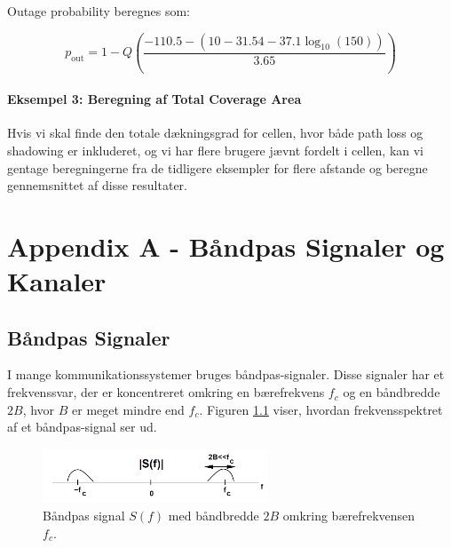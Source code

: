\documentclass[a4paper,12pt]{book}
\begin{document}
	Outage probability beregnes som:
	
	\[
	p_{\text{out}} = 1 - Q\left(\frac{-110.5 - \left(10 - 31.54 - 37.1 \log_{10}(150)\right)}{3.65}\right)
	\]
	
	\subsubsection{Eksempel 3: Beregning af Total Coverage Area}
	
	Hvis vi skal finde den totale dækningsgrad for cellen, hvor både path loss og shadowing er inkluderet, og vi har flere brugere jævnt fordelt i cellen, kan vi gentage beregningerne fra de tidligere eksempler for flere afstande og beregne gennemsnittet af disse resultater.
	
	\chapter{Appendix A - Båndpas Signaler og Kanaler}
	\section{Båndpas Signaler}
	I mange kommunikationssystemer bruges båndpas-signaler. Disse signaler har et frekvenssvar, der er koncentreret omkring en bærefrekvens \( f_c \) og en båndbredde \( 2B \), hvor \( B \) er meget mindre end \( f_c \). Figuren \ref{fig:BandpassSignal} viser, hvordan frekvensspektret af et båndpas-signal ser ud.
	
	\begin{figure}[h!]
		\centering
		\includegraphics[width=0.6\textwidth]{fig/fig11.png}
		\caption{Båndpas signal \( S(f) \) med båndbredde \( 2B \) omkring bærefrekvensen \( f_c \).}
		\label{fig:BandpassSignal}
	\end{figure}
	
\end{document}
